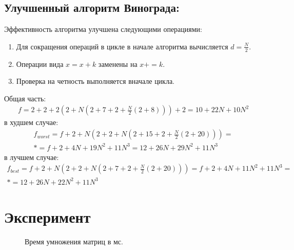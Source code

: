 \documentclass[a4paper,12pt]{article}
\begin{document}
\subsection{Улучшенный алгоритм Винограда:}
Эффективность алгоритма улучшена следующими операциями:
\begin{enumerate}
	\item Для сокращения операций в цикле в начале алгоритма вычисляется $d = \frac{N}{2}$.
	\item Операции вида $x = x + k$ заменены на $x += k$.
	\item Проверка на четность выполняется вначале цикла.
\end{enumerate}
Общая часть:
\begin{gather*}
	f = 2+2+2(2+N(2+7+2+\frac{N}{2}(2+8)))+2= 10+22N+10N^2
\end{gather*}
в худшем случае:
\begin{gather*}
f_{worst} = f + 2+N(2+2+N(2+15+2+\frac{N}{2}(2+20))) = \\*= f+2+4N+19N^2+11N^3=12+26N+29N^2+11N^3
\end{gather*}
в лучшем случае:
\begin{gather*}
f_{best} = f+2+N(2+2+N(2+7+2+\frac{N}{2}(2+20)))=f+2+4N+11N^2+11N^3=\\*=12+26N+22N^2+11N^3
\end{gather*}


\section{Эксперимент}

\begin{figure}[H]
	\noindent{}
	\caption{Время умножения матриц в мс.}
\end{figure}
\end{document}
